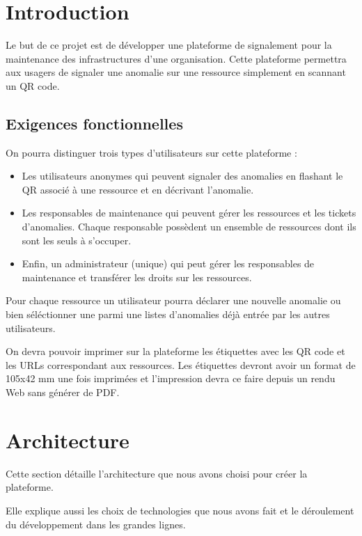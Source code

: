 \chapter{Introduction}

Le but de ce projet est de développer une plateforme de signalement pour la maintenance des
infrastructures d'une organisation. Cette plateforme permettra aux usagers de signaler une
anomalie sur une ressource simplement en scannant un QR code.

\section{Exigences fonctionnelles}

On pourra distinguer trois types d'utilisateurs sur cette plateforme :
\begin{itemize}
    \item Les utilisateurs anonymes qui peuvent signaler des anomalies en flashant le QR associé
        à une ressource et en décrivant l'anomalie.
    \item Les responsables de maintenance qui peuvent gérer les ressources et les tickets
        d'anomalies. Chaque responsable possèdent un ensemble de ressources dont ils sont les
        seuls à s'occuper.
    \item Enfin, un administrateur (unique) qui peut gérer les responsables de maintenance et
        transférer les droits sur les ressources.
\end{itemize}
\medskip

Pour chaque ressource un utilisateur pourra déclarer une nouvelle anomalie ou bien séléctionner
une parmi une listes d'anomalies déjà entrée par les autres utilisateurs.\newline

On devra pouvoir imprimer sur la plateforme les étiquettes avec les QR code et les URLs 
correspondant aux ressources. Les étiquettes devront avoir un format de 105x42 mm une fois
imprimées et l'impression devra ce faire depuis un rendu Web sans générer de PDF.

\chapter{Architecture}
Cette section détaille l'architecture que nous avons choisi pour créer la plateforme.

Elle explique aussi les choix de technologies que nous avons fait et le déroulement du
développement dans les grandes lignes.

